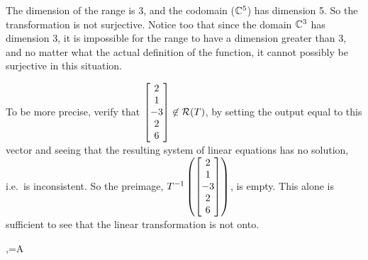 {}
%
{The dimension of the range is 3, and the codomain (${\mathbb C}\sp{5}$) has dimension 5.  So the transformation is not surjective.  Notice too that since the domain ${\mathbb C}\sp{3}$ has dimension 3, it is impossible for the range to have a dimension greater than 3, and no matter what the actual definition of the function, it cannot possibly be surjective in this situation.\par
%
To be more precise, verify that $\begin{bmatrix}2\\1\\-3\\2\\6\end{bmatrix}\not\in\mathcal{R}\!\protect\left(T\protect\right)$, by setting the output equal to this vector and seeing that the resulting system of linear equations has no solution, i.e.\ is inconsistent.  So the preimage, $T\sp{-1}\protect\left(\begin{bmatrix}2\\1\\-3\\2\\6\end{bmatrix}\protect\right)$, is empty.  This alone is sufficient to see that the linear transformation is not onto.}
%
%
%
\ltmatrixrepresentation
{,\quad{}=A}
{}
%
\newpage
%
%
%
%
%
%
%
%
